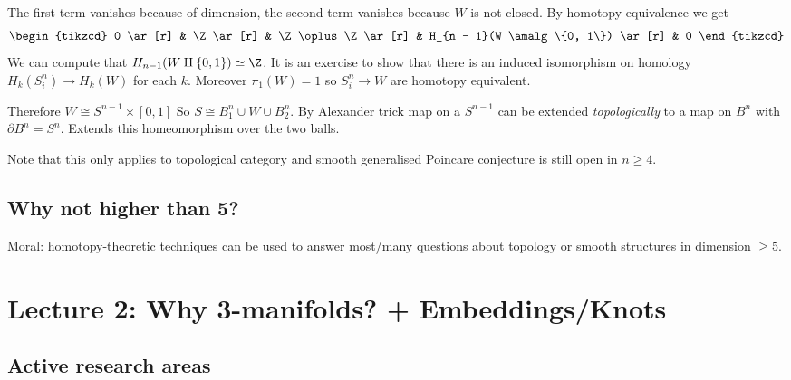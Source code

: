 \documentclass[a4paper]{article}
\renewcommand{\boundary}{\partial}
\begin{document}
The first term vanishes because of dimension, the second term vanishes because \(W\) is not closed. By homotopy equivalence we get
\[
  \begin{tikzcd}
    0 \ar[r] & \Z \ar[r] & \Z \oplus \Z \ar[r] & H_{n - 1}(W \amalg \{0, 1\}) \ar[r] & 0
  \end{tikzcd}
\]
We can compute that \(H_{n - 1}(W \amalg \{0, 1\}) \simeq \Z\). It is an exercise to show that there is an induced isomorphism on homology \(H_k(S^n_i) \to H_k(W)\) for each \(k\). Moreover \(\pi_1(W) = 1\) so \(S^n_i \to W\) are homotopy equivalent.

Therefore \(W \cong S^{n - 1} \times [0, 1]\) So \(S \cong B_1^n \cup W \cup B_2^n\). By Alexander trick map on a \(S^{n - 1}\) can be extended \emph{topologically} to a map on \(B^n\) with \(\boundary B^n = S^n\). Extends this homeomorphism over the two balls.

Note that this only applies to topological category and smooth generalised Poincare conjecture is still open in \(n \geq 4\).

\subsection{Why not higher than 5?}

Moral: homotopy-theoretic techniques can be used to answer most/many questions about topology or smooth structures in dimension \(\geq 5\).

\section{Lecture 2: Why 3-manifolds? + Embeddings/Knots}

\subsection*{Active research areas}
\end{document}
